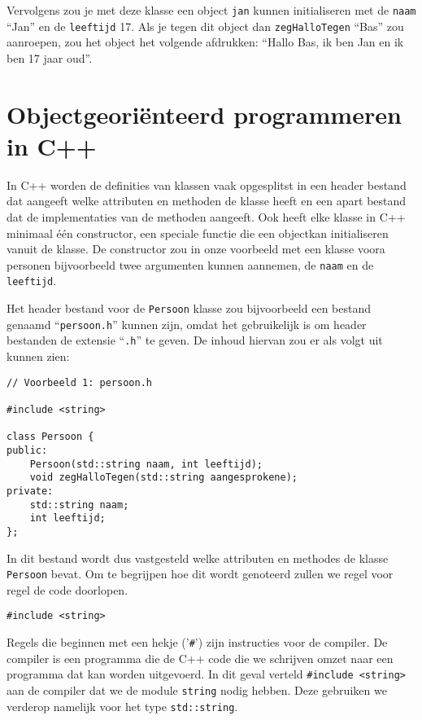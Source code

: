 \documentclass{article}
\begin{document}
Vervolgens zou je met deze klasse een object \texttt{jan} kunnen initialiseren met de \texttt{naam} “Jan” en de \texttt{leeftijd} 17. Als je tegen dit object dan \texttt{zegHalloTegen} “Bas” zou aanroepen, zou het object het volgende afdrukken: “Hallo Bas, ik ben Jan en ik ben 17 jaar oud”.

\section{Objectgeoriënteerd programmeren in C++}
In C++ worden de definities van klassen vaak opgesplitst in een header bestand dat aangeeft welke attributen en methoden de klasse heeft en een apart bestand dat de implementaties van de methoden aangeeft. Ook heeft elke klasse in C++ minimaal één constructor, een speciale functie die een objectkan initialiseren vanuit de klasse. De constructor zou in onze voorbeeld met een klasse voora personen bijvoorbeeld twee argumenten kunnen aannemen, de \texttt{naam} en de \texttt{leeftijd}.

Het header bestand voor de \texttt{Persoon} klasse zou bijvoorbeeld een bestand genaamd “\texttt{persoon.h}” kunnen zijn, omdat het gebruikelijk is om header bestanden de extensie “\texttt{.h}” te geven. De inhoud hiervan zou er als volgt uit kunnen zien:

\begin{lstlisting}
// Voorbeeld 1: persoon.h

#include <string>

class Persoon {
public:
    Persoon(std::string naam, int leeftijd);
    void zegHalloTegen(std::string aangesprokene);
private:
    std::string naam;
    int leeftijd;
};
\end{lstlisting}

In dit bestand wordt dus vastgesteld welke attributen en methodes de klasse \texttt{Persoon} bevat. Om te begrijpen hoe dit wordt genoteerd zullen we regel voor regel de code doorlopen.

\begin{lstlisting}[frame=none]
#include <string>
\end{lstlisting}

Regels die beginnen met een hekje ('\texttt{\#}') zijn instructies voor de compiler. De compiler is een programma die de C++ code die we schrijven omzet naar een programma dat kan worden uitgevoerd. In dit geval verteld \texttt{\#include <string>} aan de compiler dat we de module \texttt{string} nodig hebben. Deze gebruiken we verderop namelijk voor het type \texttt{std::string}.
\end{document}
